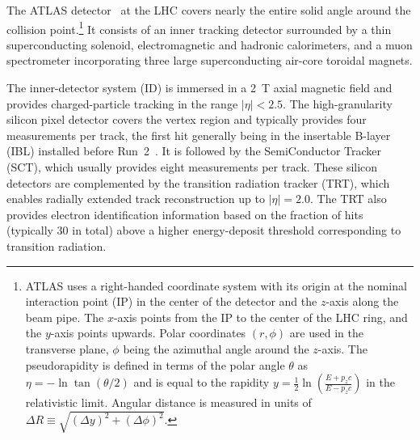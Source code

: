 \newcommand{\AtlasCoordFootnote}{%
ATLAS uses a right-handed coordinate system with its origin at the nominal interaction point (IP)
in the center of the detector and the \(z\)-axis along the beam pipe.
The \(x\)-axis points from the IP to the center of the LHC ring,
and the \(y\)-axis points upwards.
Polar coordinates \((r,\phi)\) are used in the transverse plane, 
\(\phi\) being the azimuthal angle around the \(z\)-axis.
The pseudorapidity is defined in terms of the polar angle \(\theta\) as \(\eta = -\ln \tan(\theta/2)\) and is equal to the rapidity
$ y = \frac{1}{2} \ln \left( \frac{E + p_z c}{E - p_z c} \right) $ in the relativistic limit.
Angular distance is measured in units of \(\Delta R \equiv \sqrt{(\Delta y)^{2} + (\Delta\phi)^{2}}\).}



The ATLAS detector~\cite{PERF-2007-01} at the LHC covers nearly the entire solid angle around the collision point.\footnote{\AtlasCoordFootnote}
It consists of an inner tracking detector surrounded by a thin superconducting solenoid, electromagnetic and hadronic calorimeters,
and a muon spectrometer incorporating three large superconducting air-core toroidal magnets.

The inner-detector system (ID) is immersed in a \SI{2}{\tesla} axial magnetic field 
and provides charged-particle tracking in the range \(|\eta| < 2.5\).
The high-granularity silicon pixel detector covers the vertex region and typically provides four measurements per track, 
the first hit generally being in the insertable B-layer (IBL) installed before Run~2~\cite{ATLAS-TDR-19,PIX-2018-001}.
It is followed by the SemiConductor Tracker (SCT), which usually provides eight measurements per track.
These silicon detectors are complemented by the transition radiation tracker (TRT),
which enables radially extended track reconstruction up to \(|\eta| = 2.0\). 
The TRT also provides electron identification information 
based on the fraction of hits (typically 30 in total) above a higher energy-deposit threshold corresponding to transition radiation.

